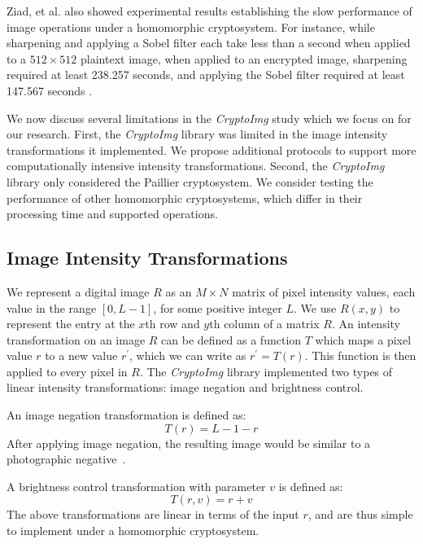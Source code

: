Ziad, et al. also showed experimental results establishing the slow performance of image operations under a homomorphic cryptosystem. For instance, while sharpening and applying a Sobel filter each take less than a second when applied to a $512\times 512$ plaintext image, when applied to an encrypted image, sharpening required at least 238.257 seconds, and applying the Sobel filter required at least 147.567 seconds \cite{ziad_cryptoimg:_2016}.

We now discuss several limitations in the \textit{CryptoImg} study which we focus on for our research. First, the \textit{CryptoImg} library was limited in the image intensity transformations it implemented. We propose additional protocols to support more computationally intensive intensity transformations.
Second, the \textit{CryptoImg} library only considered the Paillier cryptosystem. We consider testing the performance of other homomorphic cryptosystems, which differ in their processing time and supported operations.

\subsection{Image Intensity Transformations}
We represent a digital image $R$ as an $M \times N$ matrix of pixel intensity values, each value in the range $\left[0, L-1\right]$, for some positive integer $L$. We use $R(x,y)$ to represent the entry at the $x$th row and $y$th column of a matrix $R$.
An intensity transformation on an image $R$ can be defined as a function $T$ which maps a pixel value $r$ to a new value $r^\prime$, which we can write as $r^\prime = T\left(r\right)$. This function is then applied to every pixel in $R$.
The \textit{CryptoImg} library implemented two types of linear intensity transformations: image negation and brightness control.

An image negation transformation is defined as:
\begin{equation}
    T\left(r\right) = L-1-r
\end{equation}
After applying image negation, the resulting image would be similar to a photographic negative~\cite{gonzalez_digital_2008}.

A brightness control transformation with parameter $v$ is defined as:
\begin{equation}
    T\left(r,v\right) = r+v
\end{equation}
The above transformations are linear in terms of the input $r$, and are thus simple to implement under a homomorphic cryptosystem.

